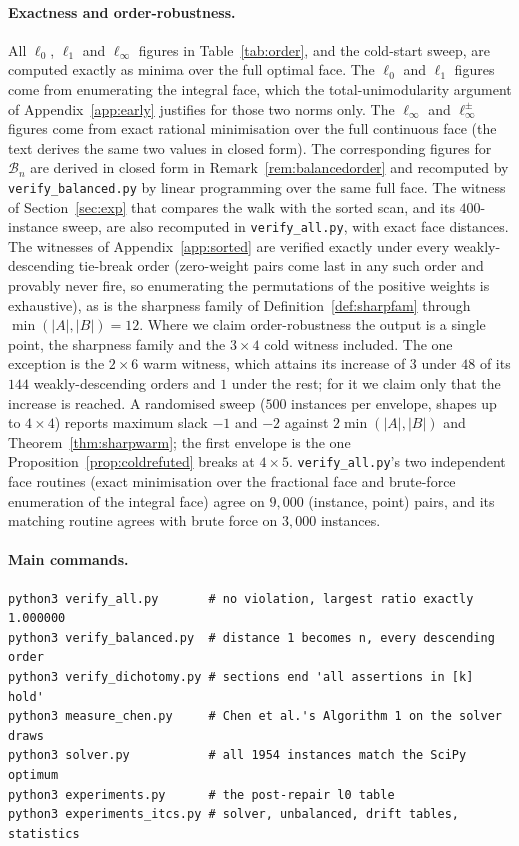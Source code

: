 \paragraph{Exactness and order-robustness.} All $\ell_0$, $\ell_1$ and $\ell_\infty$ figures in
Table~\ref{tab:order}, and the cold-start sweep, are computed exactly as minima over the full
optimal face. The $\ell_0$ and $\ell_1$ figures come from enumerating the integral face, which the
total-unimodularity argument of Appendix~\ref{app:early} justifies for those two norms only. The
$\ell_\infty$ and $\ell_\infty^\pm$ figures come from exact rational minimisation over the full
continuous face (the text derives the same two values in closed form). The corresponding figures
for $\mathcal{B}_n$ are derived in closed form in Remark~\ref{rem:balancedorder} and recomputed by
\texttt{verify\_balanced.py} by linear programming over the same full face. The witness of Section~\ref{sec:exp}
that compares the walk with the sorted scan, and its $400$-instance sweep, are also recomputed in
\texttt{verify\_all.py}, with exact face distances. The witnesses of Appendix~\ref{app:sorted} are
verified exactly under every weakly-descending tie-break order (zero-weight pairs come last in
any such order and provably never fire, so enumerating the permutations of the positive weights is
exhaustive), as is the sharpness family of Definition~\ref{def:sharpfam} through
$\min(|A|,|B|) = 12$. Where we claim order-robustness the output is a single point, the sharpness
family and the $3\times4$ cold witness included. The one exception is the $2\times6$ warm witness,
which attains its increase of $3$ under $48$ of its $144$ weakly-descending orders and $1$ under the rest;
for it we claim only that the increase is reached. A randomised sweep
($500$ instances per envelope, shapes up to $4 \times 4$) reports maximum slack $-1$ and $-2$
against $2\min(|A|,|B|)$ and Theorem~\ref{thm:sharpwarm}; the first envelope is the one
Proposition~\ref{prop:coldrefuted} breaks at $4 \times 5$. \texttt{verify\_all.py}'s two
independent face routines (exact minimisation over the fractional face and brute-force enumeration
of the integral face) agree on $9{,}000$ (instance, point) pairs, and its matching routine agrees
with brute force on $3{,}000$ instances.

\paragraph{Main commands.}
\begin{verbatim}
python3 verify_all.py       # no violation, largest ratio exactly 1.000000
python3 verify_balanced.py  # distance 1 becomes n, every descending order
python3 verify_dichotomy.py # sections end 'all assertions in [k] hold'
python3 measure_chen.py     # Chen et al.'s Algorithm 1 on the solver draws
python3 solver.py           # all 1954 instances match the SciPy optimum
python3 experiments.py      # the post-repair l0 table
python3 experiments_itcs.py # solver, unbalanced, drift tables, statistics
\end{verbatim}
